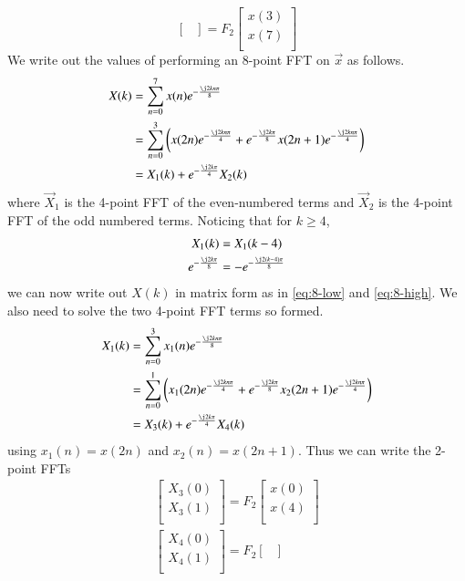 \documentclass[journal,12pt,twocolumn]{IEEEtran}
\renewcommand\thesection{\arabic{section}}
\begin{document}
\begin{enumerate}[label=\thesection.\arabic*]
\begin{equation}
\begin{bmatrix}
\end{bmatrix}
= F_{2}
\begin{bmatrix}
x(3) \\ 
x(7) \\ 
\end{bmatrix}
\end{equation}
\solution We write out the values of performing an 8-point FFT on $\vec{x}$ as follows.
\begin{align}
	X(k) &= \sum_{n = 0}^{7}x(n)e^{-\frac{\j2kn\pi}{8}} \\
		 &= \sum_{n = 0}^{3}\brak{x(2n)e^{-\frac{\j2kn\pi}{4}} + e^{-\frac{\j2k\pi}{8}}x(2n + 1)e^{-\frac{\j2kn\pi}{4}}} \\
		 &= X_1(k) + e^{-\frac{\j2k\pi}{4}}X_2(k) 
\end{align}
where $\vec{X}_1$ is the 4-point FFT of the even-numbered terms and $\vec{X}_2$ is the 4-point FFT of the odd numbered terms. Noticing that for $k \geq 4$,
\begin{align}
	X_1(k) &= X_1(k - 4) \\
	e^{-\frac{\j2k\pi}{8}} &= -e^{-\frac{\j2(k - 4)\pi}{8}}
\end{align}
we can now write out $X(k)$ in matrix form as in \eqref{eq:8-low} and \eqref{eq:8-high}. We also need to solve the two 4-point FFT terms so formed.
\begin{align}
	X_1(k) &= \sum_{n = 0}^{3}x_1(n)e^{-\frac{\j2kn\pi}{8}} \\
		 &= \sum_{n = 0}^{1}\brak{x_1(2n)e^{-\frac{\j2kn\pi}{4}} + e^{-\frac{\j2k\pi}{8}}x_2(2n + 1)e^{-\frac{\j2kn\pi}{4}}} \\
		 &= X_3(k) + e^{-\frac{\j2k\pi}{4}}X_4(k) 
\end{align}
using $x_1(n) = x(2n)$ and $x_2(n) = x(2n + 1)$. Thus we can write the 2-point FFTs
\begin{align}
\begin{bmatrix}
X_{3}(0) \\ 
X_{3}(1)\\ 
\end{bmatrix}
= F_{2}
\begin{bmatrix}
x(0) \\ 
x(4) \\ 
\end{bmatrix} \\
\begin{bmatrix}
X_{4}(0) \\ 
X_{4}(1)\\ 
\end{bmatrix}
= F_{2}
\begin{bmatrix}

\end{bmatrix}
\end{align}
\end{enumerate}
\end{document}
